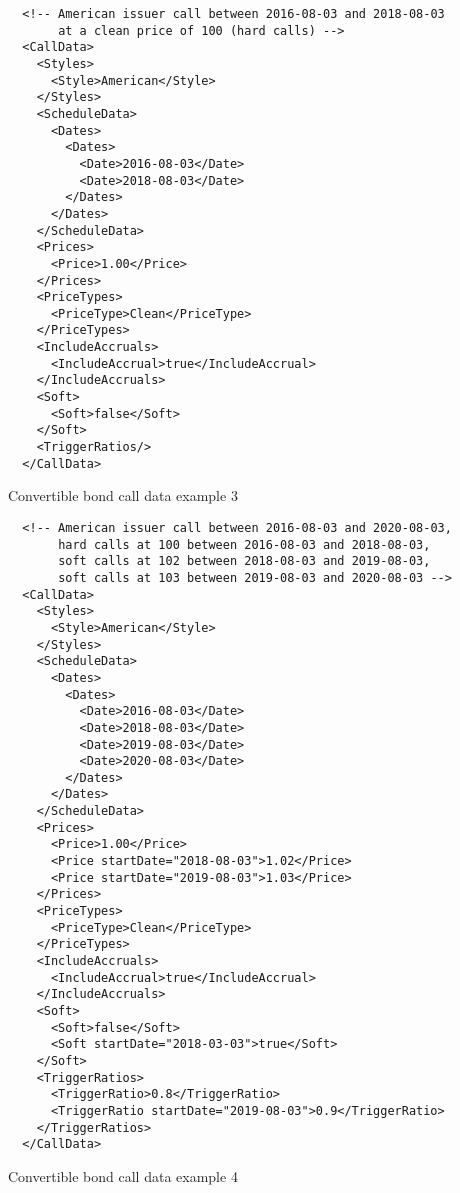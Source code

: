 \begin{listing}[H]
\begin{verbatim}
  <!-- American issuer call between 2016-08-03 and 2018-08-03
       at a clean price of 100 (hard calls) -->
  <CallData>
    <Styles>
      <Style>American</Style>
    </Styles>
    <ScheduleData>
      <Dates>
        <Dates>
          <Date>2016-08-03</Date>
          <Date>2018-08-03</Date>
        </Dates>
      </Dates>
    </ScheduleData>
    <Prices>
      <Price>1.00</Price>
    </Prices>
    <PriceTypes>
      <PriceType>Clean</PriceType>
    </PriceTypes>
    <IncludeAccruals>
      <IncludeAccrual>true</IncludeAccrual>
    </IncludeAccruals>
    <Soft>
      <Soft>false</Soft>
    </Soft>
    <TriggerRatios/>
  </CallData>
\end{verbatim}
\caption{Convertible bond call data example 3}
\label{lst:convertiblebonddata_callputdata_3}
\end{listing}

\begin{listing}[H]
\begin{verbatim}
  <!-- American issuer call between 2016-08-03 and 2020-08-03,
       hard calls at 100 between 2016-08-03 and 2018-08-03,
       soft calls at 102 between 2018-08-03 and 2019-08-03,
       soft calls at 103 between 2019-08-03 and 2020-08-03 -->
  <CallData>
    <Styles>
      <Style>American</Style>
    </Styles>
    <ScheduleData>
      <Dates>
        <Dates>
          <Date>2016-08-03</Date>
          <Date>2018-08-03</Date>
          <Date>2019-08-03</Date>
          <Date>2020-08-03</Date>
        </Dates>
      </Dates>
    </ScheduleData>
    <Prices>
      <Price>1.00</Price>
      <Price startDate="2018-08-03">1.02</Price>
      <Price startDate="2019-08-03">1.03</Price>
    </Prices>
    <PriceTypes>
      <PriceType>Clean</PriceType>
    </PriceTypes>
    <IncludeAccruals>
      <IncludeAccrual>true</IncludeAccrual>
    </IncludeAccruals>
    <Soft>
      <Soft>false</Soft>
      <Soft startDate="2018-03-03">true</Soft>
    </Soft>
    <TriggerRatios>
      <TriggerRatio>0.8</TriggerRatio>
      <TriggerRatio startDate="2019-08-03">0.9</TriggerRatio>
    </TriggerRatios>
  </CallData>
\end{verbatim}
\caption{Convertible bond call data example 4}
\label{lst:convertiblebonddata_callputdata_4}
\end{listing}

